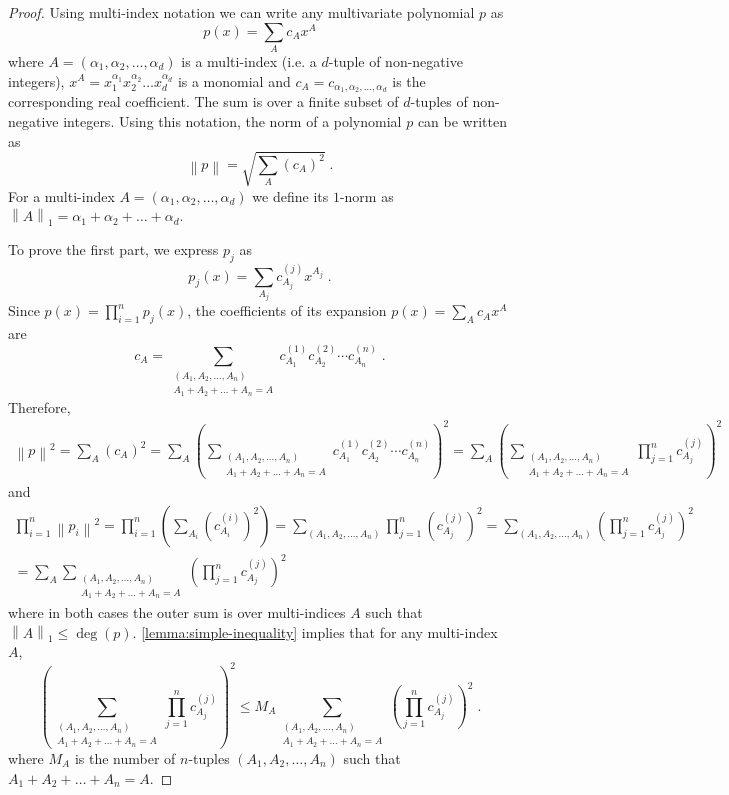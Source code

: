 \documentclass[12pt]{article}
\newcommand{\norm}[1]{\left\| #1 \right\|}  %
\begin{document}
\begin{proof}
Using multi-index notation we can write any multivariate polynomial $p$ as
$$
p(x) = \sum_A c_A x^A
$$
where $A = (\alpha_1, \alpha_2, \dots, \alpha_d)$ is a multi-index (i.e. a $d$-tuple of
non-negative integers), $x^A = x_1^{\alpha_1} x_2^{\alpha_2} \dots x_d^{\alpha_d}$ is a
monomial and $c_A = c_{\alpha_1, \alpha_2, \dots, \alpha_d}$ is the corresponding real
coefficient. The sum is over a finite subset of $d$-tuples of non-negative
integers. Using this notation, the norm of a polynomial $p$ can be written as
$$
\norm{p} = \sqrt{\sum_A (c_A)^2} \; .
$$
For a multi-index $A = (\alpha_1, \alpha_2, \dots, \alpha_d)$ we define its
$1$-norm as $\norm{A}_1 = \alpha_1 + \alpha_2 + \dots + \alpha_d$.

To prove the first part, we express $p_j$ as
$$
p_j(x) = \sum_{A_j} c^{(j)}_{A_j} x^{A_j} \; .
$$
Since $p(x) = \prod_{i=1}^n p_j(x)$, the coefficients of its expansion $p(x) =
\sum_A c_A x^A$ are
$$
c_A = \sum_{\substack{(A_1, A_2, \dots, A_n) \\ A_1 + A_2 + \dots + A_n = A}} c^{(1)}_{A_1} c^{(2)}_{A_2} \cdots c^{(n)}_{A_n} \; .
$$
Therefore,
\begin{multline*}
\norm{p}^2
= \sum_{A} (c_A)^2
= \sum_{A} \left( \sum_{\substack{(A_1, A_2, \dots, A_n) \\ A_1 + A_2 + \dots + A_n = A}} c^{(1)}_{A_1} c^{(2)}_{A_2} \cdots c^{(n)}_{A_n} \right)^2
= \sum_{A} \left( \sum_{\substack{(A_1, A_2, \dots, A_n) \\ A_1 + A_2 + \dots + A_n = A}} \prod_{j=1}^n c^{(j)}_{A_j} \right)^2
\end{multline*}
and
\begin{multline*}
\prod_{i=1}^n \norm{p_i}^2
= \prod_{i=1}^n \left( \sum_{A_i} (c^{(i)}_{A_i})^2 \right)
= \sum_{(A_1, A_2, \dots, A_n)} \prod_{j=1}^n (c^{(j)}_{A_j})^2
= \sum_{(A_1, A_2, \dots, A_n)} \left( \prod_{j=1}^n c^{(j)}_{A_j} \right)^2 \\
= \sum_A \sum_{\substack{(A_1, A_2, \dots, A_n) \\ A_1 + A_2 + \dots + A_n = A}} \left( \prod_{j=1}^n c^{(j)}_{A_j} \right)^2
\end{multline*}
where in both cases the outer sum is over multi-indices $A$ such that $\norm{A}_1 \le \deg(p)$.
\autoref{lemma:simple-inequality} implies that for any multi-index $A$,
$$
\left( \sum_{\substack{(A_1, A_2, \dots, A_n) \\ A_1 + A_2 + \dots + A_n = A}} \prod_{j=1}^n c^{(j)}_{A_j} \right)^2
\le M_A \sum_{\substack{(A_1, A_2, \dots, A_n) \\ A_1 + A_2 + \dots + A_n = A}} \left( \prod_{j=1}^n c^{(j)}_{A_j} \right)^2 \; .
$$
where $M_A$ is the number of $n$-tuples $(A_1, A_2, \dots, A_n)$ such that $A_1 +
A_2 + \dots + A_n = A$.


\end{proof}
\end{document}
